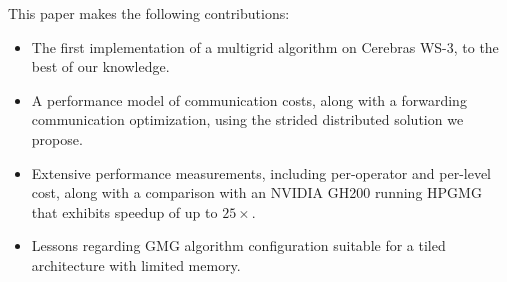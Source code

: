 \documentclass[sigconf]{acmart}
\begin{document}

This paper makes the following contributions:
\begin{itemize}
\item The first implementation of a multigrid algorithm on Cerebras WS-3, to the best of our knowledge.
\item A performance model of communication costs, along with a forwarding communication optimization, using the strided distributed solution we propose. 
\item Extensive performance measurements, including 
per-operator and per-level cost, along with a comparison with an NVIDIA GH200 running HPGMG that exhibits speedup of up to $25\times$.
\item Lessons regarding GMG algorithm configuration suitable for a tiled architecture with limited memory.
\end{itemize}
\end{document}
